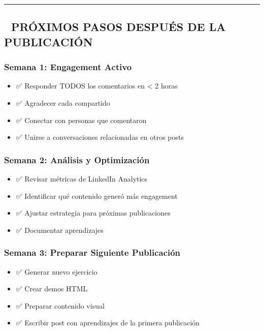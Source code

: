 \documentclass[
]{article}
\providecommand{\tightlist}{%
  \setlength{\itemsep}{0pt}\setlength{\parskip}{0pt}}
\begin{document}
\begin{center}\rule{0.5\linewidth}{0.5pt}\end{center}

\subsection{🎯 PRÓXIMOS PASOS DESPUÉS DE LA
PUBLICACIÓN}\label{pruxf3ximos-pasos-despuuxe9s-de-la-publicaciuxf3n}

\subsubsection{Semana 1: Engagement
Activo}\label{semana-1-engagement-activo}

\begin{itemize}
\tightlist
\item
  ✅ Responder TODOS los comentarios en \textless{} 2 horas
\item
  ✅ Agradecer cada compartido
\item
  ✅ Conectar con personas que comentaron
\item
  ✅ Unirse a conversaciones relacionadas en otros posts
\end{itemize}

\subsubsection{Semana 2: Análisis y
Optimización}\label{semana-2-anuxe1lisis-y-optimizaciuxf3n}

\begin{itemize}
\tightlist
\item
  ✅ Revisar métricas de LinkedIn Analytics
\item
  ✅ Identificar qué contenido generó más engagement
\item
  ✅ Ajustar estrategia para próximas publicaciones
\item
  ✅ Documentar aprendizajes
\end{itemize}

\subsubsection{Semana 3: Preparar Siguiente
Publicación}\label{semana-3-preparar-siguiente-publicaciuxf3n}

\begin{itemize}
\tightlist
\item
  ✅ Generar nuevo ejercicio
\item
  ✅ Crear demos HTML
\item
  ✅ Preparar contenido visual
\item
  ✅ Escribir post con aprendizajes de la primera publicación
\end{itemize}
\end{document}
